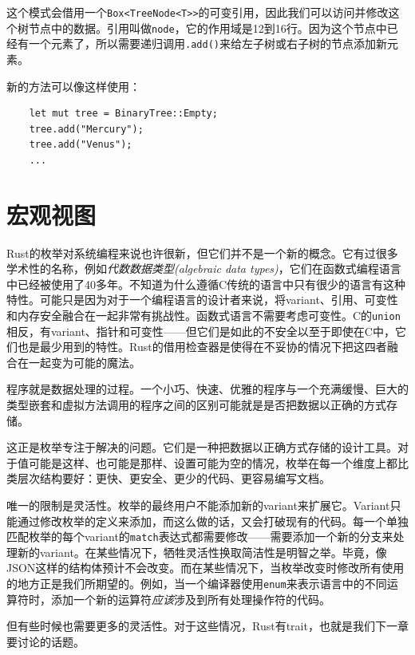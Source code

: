 这个模式会借用一个\texttt{Box<TreeNode<T>>}的可变引用，因此我们可以访问并修改这个树节点中的数据。引用叫做\texttt{node}，它的作用域是12到16行。因为这个节点中已经有一个元素了，所以需要递归调用\texttt{.add()}来给左子树或右子树的节点添加新元素。

新的方法可以像这样使用：
\begin{verbatim}
    let mut tree = BinaryTree::Empty;
    tree.add("Mercury");
    tree.add("Venus");
    ...
\end{verbatim}

\section{宏观视图}

Rust的枚举对系统编程来说也许很新，但它们并不是一个新的概念。它有过很多学术性的名称，例如\emph{代数数据类型(algebraic data types)}，它们在函数式编程语言中已经被使用了40多年。不知道为什么遵循C传统的语言中只有很少的语言有这种特性。可能只是因为对于一个编程语言的设计者来说，将variant、引用、可变性和内存安全融合在一起非常有挑战性。函数式语言不需要考虑可变性。C的\texttt{union}相反，有variant、指针和可变性——但它们是如此的不安全以至于即使在C中，它们也是最少用到的特性。Rust的借用检查器是使得在不妥协的情况下把这四者融合在一起变为可能的魔法。

程序就是数据处理的过程。一个小巧、快速、优雅的程序与一个充满缓慢、巨大的类型嵌套和虚拟方法调用的程序之间的区别可能就是是否把数据以正确的方式存储。

这正是枚举专注于解决的问题。它们是一种把数据以正确方式存储的设计工具。对于值可能是这样、也可能是那样、设置可能为空的情况，枚举在每一个维度上都比类层次结构要好：更快、更安全、更少的代码、更容易编写文档。

唯一的限制是灵活性。枚举的最终用户不能添加新的variant来扩展它。Variant只能通过修改枚举的定义来添加，而这么做的话，又会打破现有的代码。每一个单独匹配枚举的每个variant的\texttt{match}表达式都需要修改——需要添加一个新的分支来处理新的variant。在某些情况下，牺牲灵活性换取简洁性是明智之举。毕竟，像JSON这样的结构体预计不会改变。而在某些情况下，当枚举改变时修改所有使用的地方正是我们所期望的。例如，当一个编译器使用\texttt{enum}来表示语言中的不同运算符时，添加一个新的运算符\emph{应该}涉及到所有处理操作符的代码。

但有些时候也需要更多的灵活性。对于这些情况，Rust有trait，也就是我们下一章要讨论的话题。
